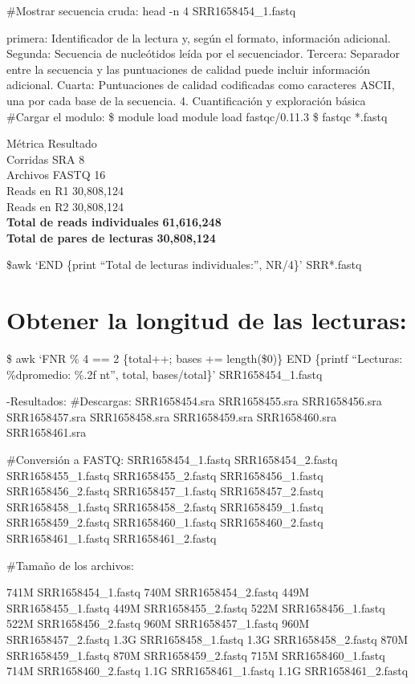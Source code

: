 \documentclass[
  letterpaper,
  DIV=11,
  numbers=noendperiod]{scrartcl}
\begin{document}
\#Mostrar secuencia cruda: head -n 4 SRR1658454\_1.fastq

primera: Identificador de la lectura y, según el formato, información
adicional. Segunda: Secuencia de nucleótidos leída por el secuenciador.
Tercera: Separador entre la secuencia y las puntuaciones de calidad
puede incluir información adicional. Cuarta: Puntuaciones de calidad
codificadas como caracteres ASCII, una por cada base de la secuencia. 4.
Cuantificación y exploración básica \#Cargar el modulo: \$ module load
module load fastqc/0.11.3 \$ fastqc *.fastq

Métrica \textbar{} Resultado \textbar{}\\
Corridas SRA \textbar{} 8 \textbar{}\\
Archivos FASTQ \textbar{} 16 \textbar{}\\
Reads en R1 \textbar{} 30,808,124 \textbar{}\\
Reads en R2 \textbar{} 30,808,124 \textbar{}\\
\textbf{Total de reads individuales} \textbar{} \textbf{61,616,248}
\textbar{}\\
\textbf{Total de pares de lecturas} \textbar{} \textbf{30,808,124}
\textbar{}

\$awk `END \{print ``Total de lecturas individuales:'', NR/4\}'
SRR*.fastq

\section{Obtener la longitud de las
lecturas:}\label{obtener-la-longitud-de-las-lecturas}

\$ awk `FNR \% 4 == 2 \{total++; bases += length(\$0)\} END \{printf
``Lecturas: \%d\nLongitud promedio: \%.2f nt\n'', total, bases/total\}'
SRR1658454\_1.fastq

-Resultados: \#Descargas: SRR1658454.sra SRR1658455.sra SRR1658456.sra
SRR1658457.sra SRR1658458.sra SRR1658459.sra SRR1658460.sra
SRR1658461.sra

\#Conversión a FASTQ: SRR1658454\_1.fastq SRR1658454\_2.fastq
SRR1658455\_1.fastq SRR1658455\_2.fastq SRR1658456\_1.fastq
SRR1658456\_2.fastq SRR1658457\_1.fastq SRR1658457\_2.fastq
SRR1658458\_1.fastq SRR1658458\_2.fastq SRR1658459\_1.fastq
SRR1658459\_2.fastq SRR1658460\_1.fastq SRR1658460\_2.fastq
SRR1658461\_1.fastq SRR1658461\_2.fastq

\#Tamaño de los archivos:

741M SRR1658454\_1.fastq 740M SRR1658454\_2.fastq 449M
SRR1658455\_1.fastq 449M SRR1658455\_2.fastq 522M SRR1658456\_1.fastq
522M SRR1658456\_2.fastq 960M SRR1658457\_1.fastq 960M
SRR1658457\_2.fastq 1.3G SRR1658458\_1.fastq 1.3G SRR1658458\_2.fastq
870M SRR1658459\_1.fastq 870M SRR1658459\_2.fastq 715M
SRR1658460\_1.fastq 714M SRR1658460\_2.fastq 1.1G SRR1658461\_1.fastq
1.1G SRR1658461\_2.fastq
\end{document}
